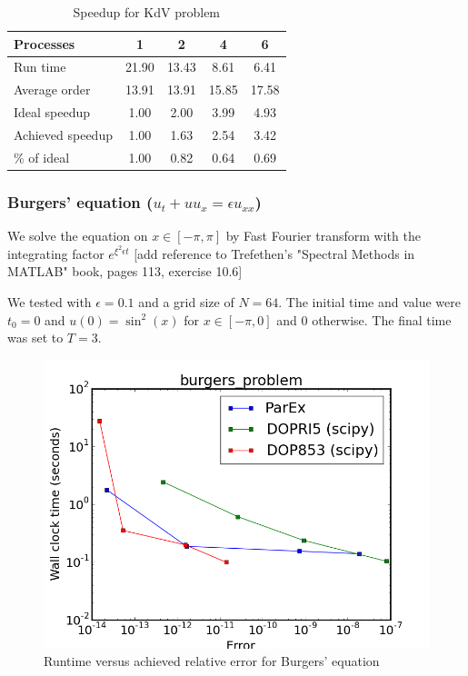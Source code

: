 \documentclass[12pt]{article}
\begin{document}
\begin{table}
\caption{Speedup for KdV problem\label{tbl:KdV}}{
\begin{tabular}{lcccc}\\
Processes & 1 & 2 & 4 & 6\\ \hline
Run time & 21.90 & 13.43 &  8.61 &  6.41 \\
Average order & 13.91 & 13.91 & 15.85 & 17.58 \\
Ideal speedup &  1.00 &  2.00 &  3.99 &  4.93 \\
Achieved speedup &  1.00 &  1.63 &  2.54 &  3.42 \\
\% of ideal &  1.00 &  0.82 &  0.64 &  0.69 \\ \hline
\end{tabular}}
\end{table}


\subsubsection{Burgers' equation ($u_t+uu_x=\epsilon u_{xx}$)}
We solve the equation on $x \in [-\pi,\pi]$ by Fast Fourier transform with the integrating factor $e^{\xi^2 \epsilon t}$ [add reference to Trefethen's "Spectral Methods in MATLAB" book, pages 113, exercise 10.6]

We tested with $\epsilon = 0.1$ and a grid size of $N=64$. The initial time and value were $t_0=0$ and $u(0) = \sin^2(x)$ for $x \in [-\pi,0]$ and $0$ otherwise. The final time was set to $T = 3$.
\begin{figure}[h]
 \includegraphics[scale=0.5]{images/burgers_problem_err_vs_time.png}
\centering
\caption{Runtime versus achieved relative error for Burgers' equation}
\end{figure}
\end{document}
